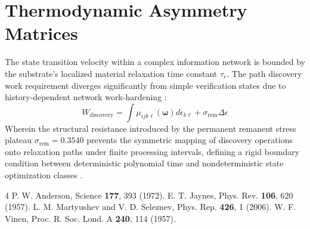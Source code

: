 \documentclass[reprint,amsmath,amssymb,aps,prd,nofootinbib]{revtex4-2}
\begin{document}
\section{Thermodynamic Asymmetry Matrices}
The state transition velocity within a complex information network is bounded by the substrate's localized material relaxation time constant $\tau_r$. The path discovery work requirement diverges significantly from simple verification states due to history-dependent network work-hardening \cite{vinen1957}:
\begin{equation}
W_{\text{discovery}} = \int \mu_{ijk\ell}(\boldsymbol{\omega}) d\epsilon_{k\ell} + \sigma_{\text{rem}}\Delta \epsilon
\end{equation}
Wherein the structural resistance introduced by the permanent remanent stress plateau $\sigma_{\text{rem}} = 0.3540$ prevents the symmetric mapping of discovery operations onto relaxation paths under finite processing intervals, defining a rigid boundary condition between deterministic polynomial time and nondeterministic state optimization classes \cite{martyushev2006}.

\begin{thebibliography}{4}
 P. W. Anderson, Science {\bf 177}, 393 (1972).
 E. T. Jaynes, Phys. Rev. {\bf 106}, 620 (1957).
 L. M. Martyushev and V. D. Seleznev, Phys. Rep. {\bf 426}, 1 (2006).
 W. F. Vinen, Proc. R. Soc. Lond. A {\bf 240}, 114 (1957).
\end{thebibliography}
\end{document}
